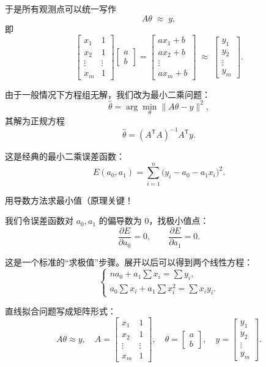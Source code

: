 于是所有观测点可以统一写作
\[
A \theta \;\approx\; y ,
\]
即
\[
\begin{bmatrix}
x_1 & 1 \\
x_2 & 1 \\
\vdots & \vdots \\
x_m & 1
\end{bmatrix}
\begin{bmatrix}
a \\[4pt] b
\end{bmatrix}
=
\begin{bmatrix}
ax_1+b \\ ax_2+b \\ \vdots \\ ax_m+b
\end{bmatrix}
\;\approx\;
\begin{bmatrix}
y_1 \\ y_2 \\ \vdots \\ y_m
\end{bmatrix}.
\]

由于一般情况下方程组无解，我们改为最小二乘问题：
\[
\hat{\theta} = \arg\min_{\theta} \|A\theta - y\|^2 ,
\]
其解为正规方程
\[
\hat{\theta} = (A^{\mathsf T}A)^{-1} A^{\mathsf T} y .
\]
\begin{dxtips}[ 数值分析课上关于最小二乘法的原理]
    这是经典的最小二乘误差函数：
\[
E(a_0,a_1) = \sum_{i=1}^n \big( y_i - a_0 - a_1 x_i \big)^2 .
\]

用导数方法求最小值（原理关键！

我们令误差函数对 $a_0, a_1$ 的偏导数为 0，找极小值点：
\[
\frac{\partial E}{\partial a_0} = 0, \qquad \frac{\partial E}{\partial a_1} = 0.
\]

这是一个标准的“求极值”步骤。展开以后可以得到两个线性方程：
\[
\begin{cases}
n a_0 + a_1 \sum x_i = \sum y_i, \\[6pt]
a_0 \sum x_i + a_1 \sum x_i^2 = \sum x_i y_i.
\end{cases}
\]
\end{dxtips}
直线拟合问题写成矩阵形式：
\[
A\theta \approx y, \quad 
A=
\begin{bmatrix}
x_1 & 1 \\
x_2 & 1 \\
\vdots & \vdots \\
x_m & 1
\end{bmatrix},\quad
\theta=\begin{bmatrix}a\\b\end{bmatrix},\quad
y=\begin{bmatrix}y_1\\y_2\\\vdots\\y_m\end{bmatrix}.
\]

